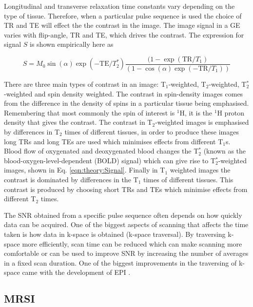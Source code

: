 Longitudinal and transverse relaxation time constants vary depending on the type of tissue. Therefore, when a particular pulse sequence is used the choice of \ac{TR} and \ac{TE} will effect the the contrast in the image. The image signal in a \ac{GE} varies with flip-angle, \ac{TR} and \ac{TE}, which drives the contrast. The expression for signal $S$ is shown empirically here as

\begin{equation}
    S = M_0\sin(\alpha)\exp(-\textrm{TE}/T_2^*)\frac{(1-\exp(\textrm{TR}/T_1)}{(1-\cos(\alpha)\exp(-\textrm{TR}/T_1))}
    \label{eqn:theory:Signal}
\end{equation}

\noindent There are three main types of contrast in an image: T$_1$-weighted, T$_2$-weighted, T$_2^*$-weighted and spin density weighted. The contrast in spin-density images comes from the difference in the density of spins in a particular tissue being emphasised. Remembering that most commonly the spin of interest is $^1$H, it is the $^1$H proton density that gives the contrast. The contrast in T$_2$-weighted images is emphasised by differences in T$_2$ times of different tissues, in order to produce these images long \ac{TR}s and long \ac{TE}s are used which minimises effects from different T$_1$s. Blood flow of oxygenated and deoxygenated blood changes the T$_2^*$ (known as the blood-oxygen-level-dependent (BOLD) signal) which can give rise to T$_2^*$-weighted images, shown in Eq. \ref{eqn:theory:Signal}. Finally in T$_1$ weighted images the contrast is dominated by differences in the T$_1$ times of different tissues. This contrast is produced by choosing short \ac{TR}s and \ac{TE}s which minimise effects from different T$_2$ times. 

The \ac{SNR} obtained from a specific pulse sequence often depends on how quickly data can be acquired. One of the biggest aspects of scanning that affects the time taken is how data in k-space is obtained (k-space traversal). By traversing k-space more efficiently, scan time can be reduced which can make scanning more comfortable or can be used to improve \ac{SNR} by increasing the number of averages in a fixed scan duration. One of the biggest improvements in the traversing of k-space came with the development of \ac{EPI} \cite{Stehling1991Echo-planarSecond}.

\subsection{MRSI}

